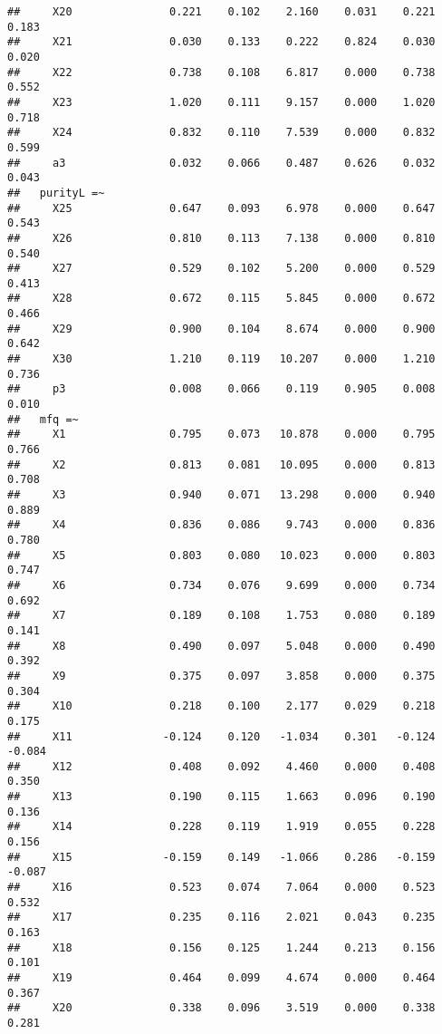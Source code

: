 \documentclass[english,man]{apa6}
\theoremstyle{definition}
\theoremstyle{definition}
\theoremstyle{definition}
\theoremstyle{remark}
\begin{document}
\begin{verbatim}
##     X20               0.221    0.102    2.160    0.031    0.221    0.183
##     X21               0.030    0.133    0.222    0.824    0.030    0.020
##     X22               0.738    0.108    6.817    0.000    0.738    0.552
##     X23               1.020    0.111    9.157    0.000    1.020    0.718
##     X24               0.832    0.110    7.539    0.000    0.832    0.599
##     a3                0.032    0.066    0.487    0.626    0.032    0.043
##   purityL =~                                                            
##     X25               0.647    0.093    6.978    0.000    0.647    0.543
##     X26               0.810    0.113    7.138    0.000    0.810    0.540
##     X27               0.529    0.102    5.200    0.000    0.529    0.413
##     X28               0.672    0.115    5.845    0.000    0.672    0.466
##     X29               0.900    0.104    8.674    0.000    0.900    0.642
##     X30               1.210    0.119   10.207    0.000    1.210    0.736
##     p3                0.008    0.066    0.119    0.905    0.008    0.010
##   mfq =~                                                                
##     X1                0.795    0.073   10.878    0.000    0.795    0.766
##     X2                0.813    0.081   10.095    0.000    0.813    0.708
##     X3                0.940    0.071   13.298    0.000    0.940    0.889
##     X4                0.836    0.086    9.743    0.000    0.836    0.780
##     X5                0.803    0.080   10.023    0.000    0.803    0.747
##     X6                0.734    0.076    9.699    0.000    0.734    0.692
##     X7                0.189    0.108    1.753    0.080    0.189    0.141
##     X8                0.490    0.097    5.048    0.000    0.490    0.392
##     X9                0.375    0.097    3.858    0.000    0.375    0.304
##     X10               0.218    0.100    2.177    0.029    0.218    0.175
##     X11              -0.124    0.120   -1.034    0.301   -0.124   -0.084
##     X12               0.408    0.092    4.460    0.000    0.408    0.350
##     X13               0.190    0.115    1.663    0.096    0.190    0.136
##     X14               0.228    0.119    1.919    0.055    0.228    0.156
##     X15              -0.159    0.149   -1.066    0.286   -0.159   -0.087
##     X16               0.523    0.074    7.064    0.000    0.523    0.532
##     X17               0.235    0.116    2.021    0.043    0.235    0.163
##     X18               0.156    0.125    1.244    0.213    0.156    0.101
##     X19               0.464    0.099    4.674    0.000    0.464    0.367
##     X20               0.338    0.096    3.519    0.000    0.338    0.281

\end{verbatim}
\end{document}
